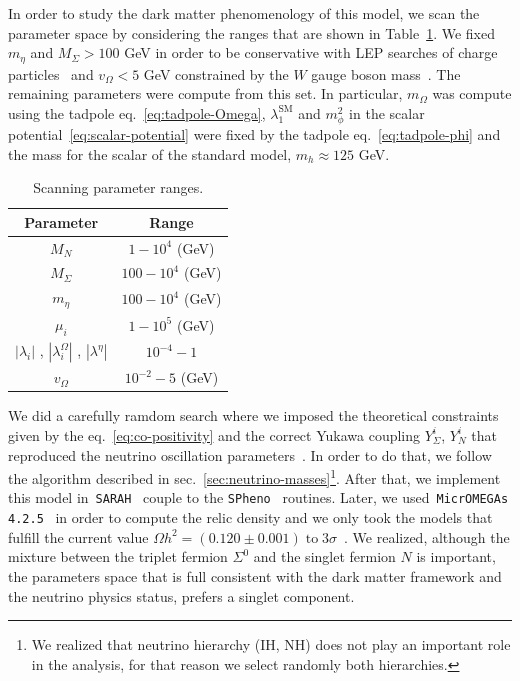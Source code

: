\documentclass[12pt,letterpaper]{article}
\begin{document}
In order to study the dark matter phenomenology of this model, we scan the parameter space by considering the ranges that are shown in Table~\ref{tab:scan-parameter}. We fixed $m_{\eta}$ and $M_{\Sigma} > 100$ GeV in order to be conservative with LEP searches of charge particles~\cite{ALEPH:2005ab} and $v_{\Omega}<5$ GeV constrained by the $W$ gauge boson mass~\cite{Agashe:2014kda}. 
The remaining parameters were compute from this set. In particular, $m_{\Omega}$ was compute using the tadpole eq.~\ref{eq:tadpole-Omega}, $\lambda_1^{\text{SM}}$ and $m_{\phi}^2$ in the scalar potential~\ref{eq:scalar-potential} were fixed by the tadpole eq.~\ref{eq:tadpole-phi} and the mass for the scalar of the standard model, $m_{h}\approx 125$ GeV.
%
\begin{table}
\centering
\begin{tabular}{|c|c|}
\hline
Parameter & Range\\
\hline
$M_N$ &  $1-10^4$ (GeV) \\
$M_{\Sigma}$ &  $100-10^4$ (GeV) \\
$m_{\eta}$ &  $100-10^4$ (GeV) \\
$\mu_i$ & $1-10^{5}$ (GeV) \\
$|\lambda_i|$ , $|\lambda_i^{\Omega}|$ , $|\lambda^{\eta}|$ & $10^{-4} - 1$ \\
$v_{\Omega}$ & $10^{-2}- 5$  (GeV)\\
\hline
\end{tabular}
\caption{Scanning parameter ranges.}
\label{tab:scan-parameter}
\end{table}
%
We did  a carefully ramdom search where we imposed the theoretical constraints given by the eq.~\ref{eq:co-positivity} and the correct Yukawa coupling $Y_{\Sigma}^i$, $Y_N^i$ that reproduced the neutrino oscillation parameters~\cite{Forero:2014bxa, deSalas:2017kay}. In order to do that, we follow the algorithm described in sec.~\ref{sec:neutrino-masses}\footnote{We realized that neutrino hierarchy (IH, NH) does not play an important role in the analysis, for that reason we select randomly both hierarchies.}.
%
After that, we implement this model in~\texttt{SARAH}~\cite{Staub:2008uz,Staub:2013tta} couple to the \texttt{SPheno}~\cite{Porod:2003um,Porod:2011nf} routines. 
Later, we used~\texttt{MicrOMEGAs 4.2.5}~\cite{Belanger:2006is} in order to compute the relic density and we only took the models that fulfill the current value $\Omega h^2 = (0.120 \pm 0.001)\; \text{to}\; 3\sigma$~\cite{Aghanim:2018eyx}.
We realized, although the mixture between the triplet fermion $\Sigma^0$ and the singlet fermion $N$ is important, the parameters space that is full consistent with the dark matter framework and the neutrino physics status, prefers a singlet component. 
\end{document}
